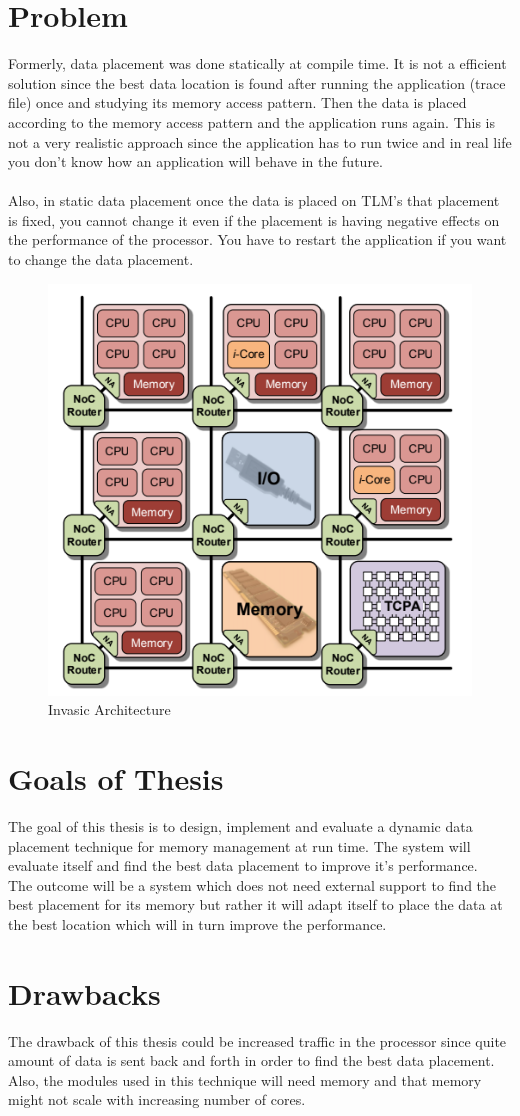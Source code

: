 \documentclass{listhesis}
\begin{document}
\section{Problem}
Formerly, data placement was done statically at compile time. It is not a efficient solution since the best data location is found after running the application (trace file) once and studying its memory access pattern. Then the data is placed according to the memory access pattern and the application runs again. This is not a very realistic approach since the application has to run twice and in real life you don't know how an application will behave in the future.\\
\\
Also, in static data placement once the data is placed on TLM's that placement is fixed, you cannot change it even if the placement is having negative effects on the performance of the processor. You have to restart the application if you want to change the data placement. 
\begin{figure}[h!]
  \includegraphics[width=0.5\linewidth]{multi-core,tile.png}
  \centering
  \caption{Invasic Architecture~\cite{iNetworkAdapter}}
  \label{fig:multi-core,tile}
\end{figure}
\section{Goals of Thesis}
The goal of this thesis is to design, implement and evaluate a dynamic data placement technique for memory management at run time. The system will evaluate itself and find the best data placement to improve it's performance. 
\\
The outcome will be a system which does not need external support to find the best placement for its memory but rather it will adapt itself to place the data at the best location which will in turn improve the performance. 
\section{Drawbacks}
The drawback of this thesis could be increased traffic in the processor since quite amount of data is sent back and forth in order to find the best data placement. Also, the modules used in this technique will need memory and that memory might not scale with increasing number of cores. 
\end{document}
